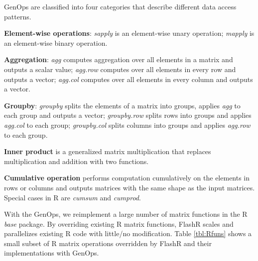 GenOps are classified into four categories that describe different data access
patterns.

\noindent \textbf{Element-wise operations}:
\textit{sapply} is an element-wise unary operation; \textit{mapply}
is an element-wise binary operation.

\noindent \textbf{Aggregation}: \textit{agg} computes aggregation over
all elements in a matrix and outputs a scalar value; \textit{agg.row}
computes over all elements in every row and outputs a vector;
\textit{agg.col} computes over all elements in every column and
outputs a vector.

\noindent \textbf{Groupby}: \textit{groupby} splits the elements of a matrix
into groups, applies \textit{agg} to each group and outputs a vector;
\textit{groupby.row} splits rows into groups and applies \textit{agg.col}
to each group; \textit{groupby.col} splits columns into groups and applies
\textit{agg.row} to each group.

\noindent \textbf{Inner product} is a generalized matrix multiplication
that replaces multiplication and addition with two functions.

\noindent \textbf{Cumulative operation} performs computation cumulatively
on the elements in rows or columns and outputs matrices with the same
shape as the input matrices. Special cases in R are \textit{cumsum} and
\textit{cumprod}.

With the GenOps, we reimplement a large number of matrix functions in
the R \textit{base} package.
By overriding existing R matrix functions, FlashR scales and parallelizes
existing R code with little/no modification. Table \ref{tbl:Rfuns} shows
a small subset of R matrix operations overridden by FlashR and their
implementations with GenOps.

